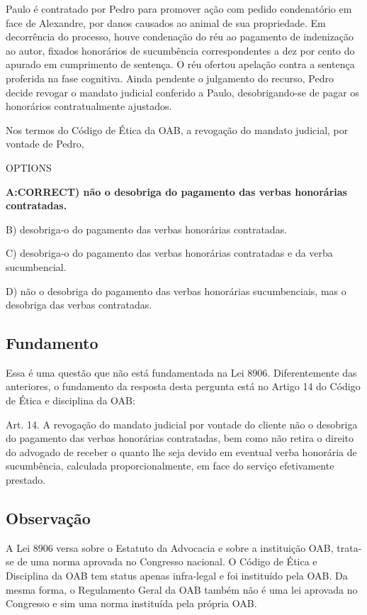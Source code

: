 \documentclass[12pt]{article}
\begin{document}
Paulo é contratado por Pedro para promover ação com pedido 
condenatório em face de Alexandre, por danos causados ao 
animal de sua propriedade. Em decorrência do processo, 
houve condenação do réu ao pagamento de indenização ao 
autor, fixados honorários de sucumbência correspondentes a 
dez por cento do apurado em cumprimento de sentença. O 
réu ofertou apelação contra a sentença proferida na fase 
cognitiva. Ainda pendente o julgamento do recurso, Pedro 
decide revogar o mandato judicial conferido a Paulo, 
desobrigando-se de pagar os honorários contratualmente 
ajustados. 

Nos termos do Código de Ética da OAB, a revogação do 
mandato judicial, por vontade de Pedro, 
 
OPTIONS

\textbf{A:CORRECT) não o desobriga do pagamento das verbas honorárias 
contratadas. }

B) desobriga-o do pagamento das verbas honorárias 
contratadas. 

C) desobriga-o do pagamento das verbas honorárias 
contratadas e da verba sucumbencial. 

D) não o desobriga do pagamento das verbas honorárias 
sucumbenciais, mas o desobriga das verbas contratadas. 

\subsection{Fundamento} 

Essa é uma questão que não está fundamentada na Lei 8906. Diferentemente das anteriores, o fundamento da resposta desta pergunta está no Artigo 14 do Código de Ética e disciplina da OAB:

Art. 14. A revogação do mandato judicial por vontade do cliente não o desobriga do pagamento  das  verbas  honorárias  contratadas,  bem  como  não  retira  o  direito  do advogado  de  receber  o  quanto  lhe  seja  devido  em eventual  verba  honorária  de sucumbência, calculada proporcionalmente, em face do serviço efetivamente prestado. 

\subsection{Observação} 

A Lei 8906 versa sobre o Estatuto da Advocacia e sobre a instituição OAB, trata-se de uma norma aprovada no Congresso nacional. O Código de Ética e Disciplina da OAB tem status apenas infra-legal e foi instituído pela OAB. Da mesma forma, o Regulamento Geral da OAB também não é uma lei aprovada no Congresso e sim uma norma instituída pela própria OAB.
\end{document}
